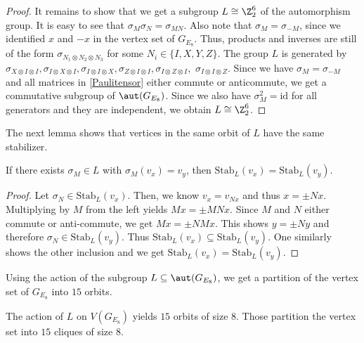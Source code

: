 \begin{proof}
It remains to show that we get a subgroup $L\cong \Z_2^6$ of the automorphism group. It is easy to see that $\sigma_M \sigma_N=\sigma_{MN}$. Also note that $\sigma_M=\sigma_{-M}$, since we identified $x$ and $-x$ in the vertex set of $G_{E_8}$. Thus, products and inverses are still of the form $\sigma_{N_1\otimes N_2\otimes N_3}$ for some $N_i \in \{I,X,Y,Z\}$. The group $L$ is generated by $\sigma_{X\otimes I\otimes I}, \sigma_{I\otimes X\otimes I},\sigma_{I\otimes I\otimes X},\sigma_{Z\otimes I\otimes I},\sigma_{I\otimes Z\otimes I},$ $\sigma_{I\otimes I\otimes Z}$. Since we have $\sigma_M=\sigma_{-M}$ and all matrices in \eqref{Paulitensor} either commute or anticommute, we get a commutative subgroup of $\aut(G_{E_8})$. Since we also have $\sigma_M^2=\mathrm{id}$ for all generators and they are independent, we obtain $L\cong \Z_2^6$.
\end{proof}

The next lemma shows that vertices in the same orbit of $L$ have the same stabilizer. 

\begin{lemm}\label{stabeq}
If there exists $\sigma_M\in L$ with $\sigma_M(v_x)=v_y$, then $\mathrm{Stab}_L(v_x)=\mathrm{Stab}_L(v_y)$.
\end{lemm}

\begin{proof}
Let $\sigma_N \in \mathrm{Stab}_L(v_x)$. Then, we know $v_x=v_{Nx}$ and thus $x =\pm Nx$. Multiplying by $M$ from the left yields $Mx=\pm MNx$. Since $M$ and $N$ either commute or anti-commute, we get $Mx=\pm NMx$. This shows $y=\pm Ny$ and therefore $\sigma_N \in \mathrm{Stab}_L(v_y)$. Thus $\mathrm{Stab}_L(v_x)\subseteq \mathrm{Stab}_L(v_y)$. One similarly shows the other inclusion and we get $\mathrm{Stab}_L(v_x)= \mathrm{Stab}_L(v_y)$.
\end{proof}

Using the action of the subgroup $L\subseteq \aut(G_{E_8})$, we get a partition of the vertex set of $G_{E_8}$ into $15$ orbits. 

\begin{lemm}
The action of $L$ on $V(G_{E_8})$ yields $15$ orbits of size $8$. Those partition the vertex set into $15$ cliques of size $8$. 
\end{lemm}

